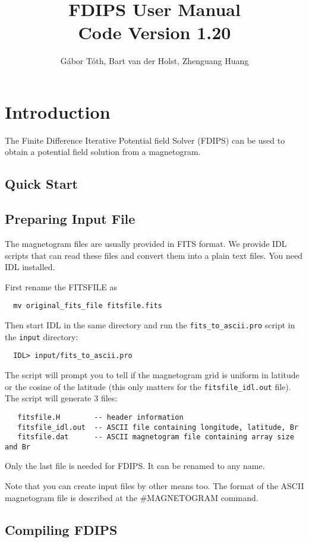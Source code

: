 \documentclass[12pt]{article}
\title{FDIPS User Manual \\ \large Code Version 1.20}
\author{G\'abor T\'oth, Bart van der Holst, Zhenguang Huang}
\begin{document}
\maketitle

\section{Introduction}

The Finite Difference Iterative Potential field Solver (FDIPS) can be
used to obtain a potential field solution from a magnetogram.

\subsection{Quick Start}



\subsection{Preparing Input File}

The magnetogram files are usually provided in FITS format. We provide
IDL scripts that can read these files and convert them into a plain
text files. You need IDL installed. 

First rename the FITSFILE as
\begin{verbatim}
  mv original_fits_file fitsfile.fits
\end{verbatim}
Then start IDL in the same directory and run the {\tt fits\_to\_ascii.pro}
script in the {\tt input} directory:
\begin{verbatim}
  IDL> input/fits_to_ascii.pro
\end{verbatim}
The script will prompt you to tell if the magnetogram grid is uniform 
in latitude or the cosine of the latitude (this only matters for the
{\tt fitsfile\_idl.out} file). The script will generate 3 files:
\begin{verbatim}
   fitsfile.H        -- header information
   fitsfile_idl.out  -- ASCII file containing longitude, latitude, Br
   fitsfile.dat      -- ASCII magnetogram file containing array size and Br
\end{verbatim}
Only the last file is needed for FDIPS. It can be renamed to any name.

Note that you can create input files by other means too. The format of the
ASCII magnetogram file is described at the \#MAGNETOGRAM command.

\subsection{Compiling FDIPS}
\end{document}
